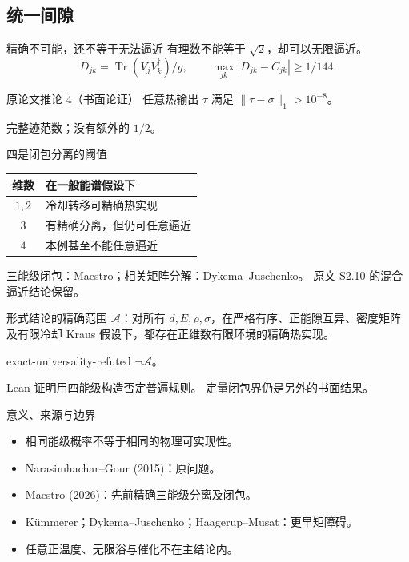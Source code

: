 \documentclass{beamer}
\begin{document}
\subsection{统一间隙}
\begin{frame}{精确不可能，还不等于无法逼近}
有理数不能等于 $\sqrt2$，却可以无限逼近。
 \[D_{jk}=\operatorname{Tr}(V_jV_k^\dagger)/g,\qquad
 \max_{jk}|D_{jk}-C_{jk}|\geq1/144.\]
 \begin{block}{原论文推论 4（书面论证）}
 任意热输出 $\tau$ 满足 $\|\tau-\sigma\|_1>10^{-8}$。
 \end{block}
 完整迹范数；没有额外的 $1/2$。
\end{frame}
\begin{frame}{四是闭包分离的阈值}
\begin{tabular}{cl}
 维数 & 在一般能谱假设下\\\hline
 $1,2$ & 冷却转移可精确热实现\\
 $3$ & 有精确分离，但仍可任意逼近\\
 $4$ & 本例甚至不能任意逼近
 \end{tabular}
 \medskip

 三能级闭包：Maestro；相关矩阵分解：Dykema--Juschenko。
 原文 S2.10 的混合逼近结论保留。
\end{frame}
\begin{frame}{形式结论的精确范围}
$\mathcal A$：对所有 $d,E,\rho,\sigma$，在严格有序、正能隙互异、密度矩阵及有限冷却 Kraus 假设下，都存在正维数有限环境的精确热实现。
 \begin{bookresult}{exact-universality-refuted}
 $\neg\mathcal A$。
 \end{bookresult}
 Lean 证明用四能级构造否定普遍规则。
 定量闭包界仍是另外的书面结果。
\end{frame}
\begin{frame}{意义、来源与边界}
\begin{itemize}
 \item 相同能级概率不等于相同的物理可实现性。
 \item Narasimhachar--Gour (2015)：原问题。
 \item Maestro (2026)：先前精确三能级分离及闭包。
 \item Kümmerer；Dykema--Juschenko；Haagerup--Musat：更早矩障碍。
 \item 任意正温度、无限浴与催化不在主结论内。
 \end{itemize}
\end{frame}
\appendix
\end{document}
